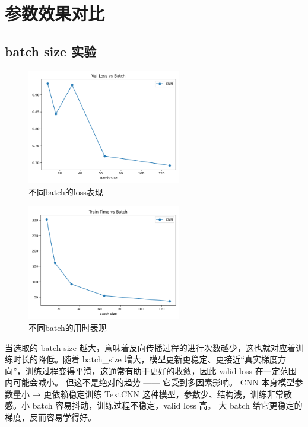 \documentclass{article}
\begin{document}
\section{参数效果对比}

\subsection{batch size 实验}

\begin{figure}[h]
    \centering
    \includegraphics[width=0.6\textwidth]{../results/batch_loss.png}
    \caption{不同batch的loss表现}
\end{figure}

\begin{figure}[h]
    \centering
    \includegraphics[width=0.6\textwidth]{../results/batch_time.png}
    \caption{不同batch的用时表现}
\end{figure}

当选取的 batch size 越大，意味着反向传播过程的进行次数越少，这也就对应着训
练时长的降低。随着 batch\_size 增大，模型更新更稳定、更接近“真实梯度方向”，训练过程变得平滑，这通常有助于更好的收敛，因此 valid loss 在一定范围内可能会减小。
但这不是绝对的趋势 —— 它受到多因素影响。 CNN 本身模型参数量小 → 更依赖稳定训练
TextCNN 这种模型，参数少、结构浅，训练非常敏感。小 batch 容易抖动，训练过程不稳定，valid loss 高。
大 batch 给它更稳定的梯度，反而容易学得好。
\end{document}
